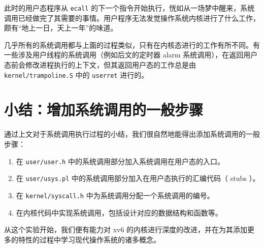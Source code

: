 此时的用户态程序从 \lstinline{ecall} 的下一个指令开始执行，恍如从一场梦中醒来，系统调用已经做完了其需要的事情。用户程序无法发觉操作系统内核进行了什么工作，颇有“地上一日，天上一年”的味道。

几乎所有的系统调用都与上面的过程类似，只有在内核态进行的工作有所不同。有一些涉及用户线程的系统调用（例如后文的定时器 alarm 系统调用），在返回用户态前会修改进程执行的上下文，但其返回用户态的工作总是由 \lstinline{kernel/trampoline.S} 中的 \lstinline{userret} 进行的。

\section{小结：增加系统调用的一般步骤}

通过上文对于系统调用执行过程的小结，我们很自然地能得出添加系统调用的一般步骤：
\begin{enumerate}
    \item 在 \lstinline{user/user.h} 中的系统调用部分加入系统调用在用户态的入口。
    \item 在 \lstinline{user/usys.pl} 中的系统调用部分加入在用户态执行的汇编代码（ stubs ）。
    \item 在 \lstinline{kernel/syscall.h} 中为系统调用分配一个系统调用的编号。
    \item 在内核代码中实现系统调用，包括设计对应的数据结构和函数等。
\end{enumerate}
从这个实验开始，我们便有能力对 xv6 的内核进行深度的改进，并在为其添加更多的特性的过程中学习现代操作系统的诸多概念。